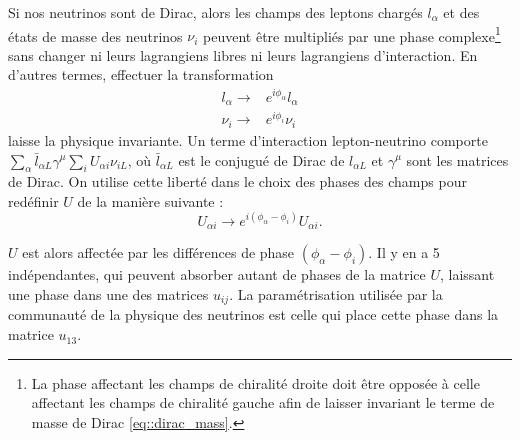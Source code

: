             Si nos neutrinos sont de Dirac, alors les champs des leptons chargés $l_{\alpha}$ et des états de masse des neutrinos $\nu_i$ peuvent être multipliés par une phase complexe\footnote{La phase affectant les champs de chiralité droite doit être opposée à celle affectant les champs de chiralité gauche afin de laisser invariant le terme de masse de Dirac \eqref{eq::dirac_mass}.} sans changer ni leurs lagrangiens libres ni leurs lagrangiens d'interaction. En d'autres termes, effectuer la transformation 
            \begin{eqnarray}
                l_{\alpha}\to & e^{i\phi_{\alpha}}l_{\alpha} \\
                \nu_i\to & e^{i\phi_i}\nu_i 
            \end{eqnarray}
            laisse la physique invariante. Un terme d'interaction lepton-neutrino comporte $\sum_{\alpha}\bar{l}_{\alpha L}\gamma^{\mu}\sum_i U_{\alpha i}\nu_{i L}$, où $\bar{l}_{\alpha L}$ est le conjugué de Dirac de $l_{\alpha L}$ et $\gamma^{\mu}$ sont les matrices de Dirac. On utilise cette liberté dans le choix des phases des champs pour redéfinir $U$ de la manière suivante :
            \begin{equation}
                U_{\alpha i}\to e^{i(\phi_{\alpha}-\phi_i)}U_{\alpha i}.
            \end{equation}
            
            $U$ est alors affectée par les différences de phase $(\phi_{\alpha}-\phi_i)$. Il y en a 5 indépendantes, qui peuvent absorber autant de phases de la matrice $U$, laissant une phase dans une des matrices $u_{ij}$. La paramétrisation utilisée par la communauté de la physique des neutrinos est celle qui place cette phase dans la matrice $u_{13}$.
            
